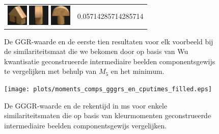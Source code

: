 {\begin{figure}[p]
\begin{tabular}{m{11cm} | m{3cm} |}
\includegraphics[width=1cm]{coil/beeld-46.eps}
\includegraphics[width=1cm]{coil/beeld-2.eps}
\includegraphics[width=1cm]{coil/beeld-0.eps}
& {\scriptsize 0.05714285714285714}
\\
\end{tabular}
\vspace{5pt}
\caption{\label{fig:results_beste_dom_colors_wu_comps_pixelgeb}De GGR-waarde en de eerste tien 
resultaten voor elk voorbeeld bij de similariteitsmaat die we 
bekomen door op basis van Wu kwantisatie geconstrueerde intermediaire beelden componentsgewijs 
te vergelijken met behulp van $M_{5}$ en het minimum.}
\end{figure}

\begin{figure}[p]
\centering
\texttt{[image: plots/moments\_comps\_gggrs\_en\_cputimes\_filled.eps]}
\vspace{1pt}
\caption{\label{fig:moments_comps_gggrs_en_cputimes}De GGGR-waarde en de rekentijd in ms voor 
enkele similariteitsmaten die
op basis van kleurmomenten geconstrueerde intermediaire beelden componentsgewijs vergelijken.}
\end{figure}

}
